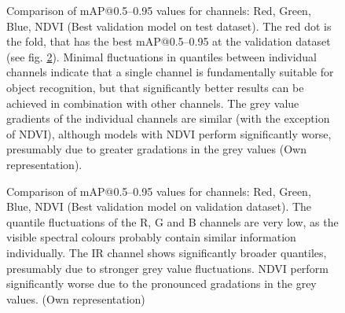 \begin{figure}[htbp]
    \centering
    
    \caption[Comparison of \acrshort{mAP}@0.5--0.95 values for channels: red, green, blue, ndvi (Best validation model on test dataset)]{Comparison of \acrshort{mAP}@0.5--0.95 values for channels: Red, Green, Blue, NDVI (Best validation model on test dataset). The red dot is the fold, that has the best \acrshort{mAP}@0.5--0.95 at the validation dataset (see fig. \ref{fig:ablation_map50-95:val_on_val}). Minimal fluctuations in quantiles between individual channels indicate that a single channel is fundamentally suitable for object recognition, but that significantly better results can be achieved in combination with other channels. The grey value gradients of the individual channels are similar (with the exception of NDVI), although models with NDVI perform significantly worse, presumably due to greater gradations in the grey values (Own representation).}
    \label{fig:ablation_map50-95:val_on_test}
\end{figure}


\begin{figure}[htbp]
    \centering
    
    \caption[Comparison of \acrshort{mAP}@0.5--0.95 values for channels: red, green, blue, ndvi (Best validation model on validation dataset)]{Comparison of \acrshort{mAP}@0.5--0.95 values for channels: Red, Green, Blue, NDVI (Best validation model on validation dataset). The quantile fluctuations of the R, G and B channels are very low, as the visible spectral colours probably contain similar information individually. The IR channel shows significantly broader quantiles, presumably due to stronger grey value fluctuations. NDVI perform significantly worse due to the pronounced gradations in the grey values. (Own representation)}
    \label{fig:ablation_map50-95:val_on_val}
\end{figure}

